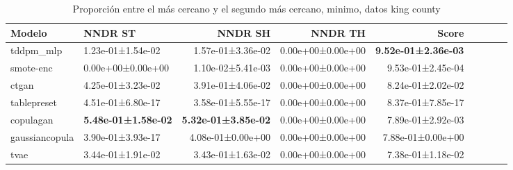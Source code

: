 \begin{table}[H]
\centering
\fontsize{10}{14}\selectfont
\caption{Proporción entre el más cercano y el segundo más cercano, minimo, datos king county}
\label{table-dcr-king county-a}
\begin{tabular}{|l|l|r|r|r|r|r|r|r|}
\hline
\rowcolor[gray]{0.8}
Modelo & NNDR ST & NNDR SH & NNDR TH & \textbf{Score} \\
\hline tddpm\_mlp & 1.23e-01±1.54e-02 & 1.57e-01±3.36e-02 & 0.00e+00±0.00e+00 & \bfseries 9.52e-01±2.36e-03 \\
\hline smote-enc & \cellcolor[rgb]{0.9, 0.54, 0.52} 0.00e+00±0.00e+00 & \cellcolor[rgb]{0.9, 0.54, 0.52} 1.10e-02±5.41e-03 & 0.00e+00±0.00e+00 & 9.53e-01±2.45e-04 \\
\hline ctgan & 4.25e-01±3.23e-02 & 3.91e-01±4.06e-02 & 0.00e+00±0.00e+00 & 8.24e-01±2.02e-02 \\
\hline tablepreset & 4.51e-01±6.80e-17 & 3.58e-01±5.55e-17 & 0.00e+00±0.00e+00 & 8.37e-01±7.85e-17 \\
\hline copulagan & \bfseries 5.48e-01±1.58e-02 & \bfseries 5.32e-01±3.85e-02 & 0.00e+00±0.00e+00 & 7.89e-01±2.92e-03 \\
\hline gaussiancopula & 3.90e-01±3.93e-17 & 4.08e-01±0.00e+00 & 0.00e+00±0.00e+00 & 7.88e-01±0.00e+00 \\
\hline tvae & 3.44e-01±1.91e-02 & 3.43e-01±1.63e-02 & 0.00e+00±0.00e+00 & \cellcolor[rgb]{0.9, 0.54, 0.52} 7.38e-01±1.18e-02 \\
\hline
\end{tabular}
\end{table}
